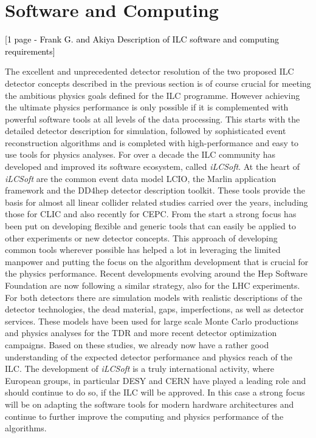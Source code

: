 \documentclass[%
 reprint,
 amsmath,amssymb,
 aps,
]{revtex4-1}
\newcommand{\todo}[1]{\textcolor{black}{{#1}}}
\begin{document}

\section{\label{sec:soft}Software and Computing}

\todo{ [1 page - Frank G. and Akiya
Description of ILC software and computing requirements] }

The excellent and unprecedented detector resolution of the two proposed ILC detector concepts described
in the previous section is of course crucial for meeting the ambitious physics goals
defined for the ILC programme. However achieving the ultimate physics performance is only possible if it
is complemented with powerful software tools at all levels of the data processing. This starts with the
detailed detector description for simulation, followed by sophisticated event reconstruction algorithms
and is completed with high-performance and easy to use tools for physics analyses.
For over a decade the ILC community has developed and improved its software ecosystem, called \emph{iLCSoft}.
At the heart of \emph{iLCSoft} are the common event data model LCIO, the Marlin application framework and the
DD4hep detector description toolkit. These tools provide the basis for almost all linear collider related
studies carried over the years, including those for CLIC and also recently for CEPC.
From the start a strong focus has been put on developing flexible and generic tools that can easily be applied
to other experiments or new detector concepts. This approach of developing common tools wherever possible
has helped a lot in leveraging the limited manpower and putting the focus on the algorithm development that
is crucial for the physics performance. Recent developments evolving around the Hep Software Foundation are
now following a similar strategy, also for the LHC experiments.
For both detectors there are simulation models with realistic descriptions of the detector technologies,
the dead material, gaps, imperfections, as well as detector services. These models have been used for large
scale Monte Carlo productions and physics analyses for the TDR and more recent detector optimization
campaigns. Based on these studies, we already now have a rather good understanding of the expected
detector performance and physics reach of the ILC.
The development of \emph{iLCSoft} is a truly international activity, where European groups, in particular DESY and
CERN have played a leading role and should continue to do so, if the ILC will be approved. In this case
a strong focus will be on adapting the software tools for modern hardware architectures and continue to
further improve the computing and physics performance of the algorithms.
\end{document}
